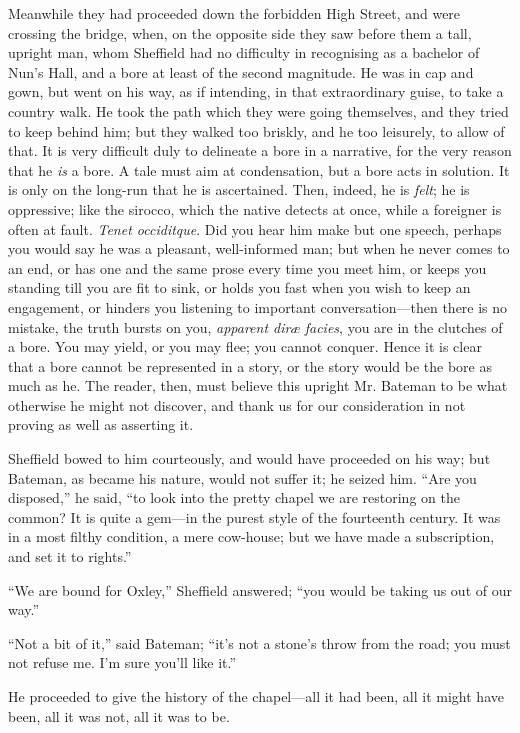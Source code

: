 Meanwhile they had proceeded down the forbidden High Street, and
were crossing the bridge, when, on the opposite side they saw before
them a tall, upright man, whom Sheffield had no difficulty in
recognising as a bachelor of Nun's Hall, and a bore at least of the
second magnitude. He was in cap and gown, but went on his way, as if
intending, in that extraordinary guise, to take a country walk. He
took the path which they were going themselves, and they tried to keep
behind him; but they walked too briskly, and he too leisurely, to
allow of that. It is very difficult duly to delineate a bore in a
narrative, for the very reason that he \emph{is} a bore. A tale must
aim at condensation, but a bore acts in solution. It is only on the
long-run that he is ascertained. Then, indeed, he is \emph{felt}; he
is oppressive; like the sirocco, which the native detects at once,
while a foreigner is often at fault. \emph{Tenet occiditque}. Did you
hear him make but one speech, perhaps you would say he was a pleasant,
well-informed man; but when he never comes to an end, or has one and
the same prose every time you meet him, or keeps you standing till you
are fit to sink, or holds you fast when you wish to keep an
engagement, or hinders you listening to important conversation—then
there is no mistake, the truth bursts on you, \emph{apparent diræ facies},
you are in the clutches of a bore. You may yield, or you may flee; you
cannot conquer. Hence it is clear that a bore cannot be represented in
a story, or the story would be the bore as much as he. The reader,
then, must believe this upright Mr. Bateman to be what otherwise he
might not discover, and thank us for our consideration in not proving
as well as asserting it.

Sheffield bowed to him courteously, and would have proceeded on his
way; but Bateman, as became his nature, would not suffer it; he seized
him. ``Are you disposed,'' he said, ``to look into the
pretty chapel we are restoring on the common? It is quite a gem—in
the purest style of the fourteenth century. It was in a most filthy
condition, a mere cow-house; but we have made a subscription, and set
it to rights.''

``We are bound for Oxley,'' Sheffield answered; ``you
would be taking us out of our way.''

``Not a bit of it,'' said Bateman; ``it's not a stone's
throw from the road; you must not refuse me. I'm sure you'll like
it.''

He proceeded to give the history of the chapel—all it had been,
all it might have been, all it was not, all it was to be.

